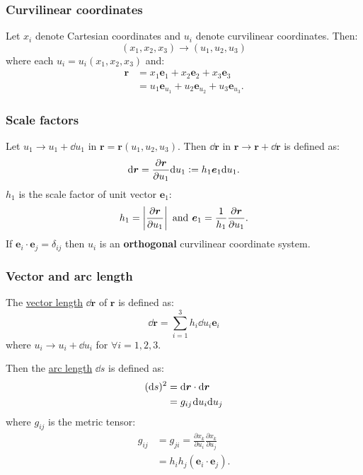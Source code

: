 \documentclass{article}
\newcommand{\deq}{\vcentcolon=}
\newcommand{\vc}[1]{\boldsymbol{#1}}
\begin{document}
\begin{multicols*}{3}
\subsubsection*{Curvilinear coordinates}
Let $x_i$ denote Cartesian coordinates
and $u_i$ denote curvilinear coordinates. Then:
$$(x_1,x_2,x_3)\rightarrow(u_1,u_2,u_3)$$
where each $u_i=u_i(x_1,x_2,x_3)$ and:
\begin{align*}
    \vc{r}
    &=x_1\vc{e}_1+x_2\vc{e}_2+x_3\vc{e}_3 \\
    &=u_1\vc{e}_{u_1}+u_2\vc{e}_{u_2}+u_3\vc{e}_{u_3}.
\end{align*}

\subsubsection*{Scale factors}
Let $u_1\rightarrow u_1+\dd u_1$ in
$\boldsymbol{r}=\boldsymbol{r}(u_1,u_2,u_3)$.
Then $\dd\vc{r}$ in 
$\boldsymbol{r}\rightarrow\boldsymbol{r}+\dd\boldsymbol{r}$
is defined as:
$$\dd\boldsymbol{r}
=\frac{\partial\boldsymbol{r}}{\partial u_1}\dd u_1
\deq h_1\boldsymbol{e}_1\dd u_1.$$
$h_1$ is the scale factor of unit vector 
$\boldsymbol{e}_1$:
$$h_1=\left|\frac{\partial
\boldsymbol{r}}{\partial u_1}\right|
\hspace{0.05in}\text{and}\hspace{0.05in}
\boldsymbol{e}_1=\frac{1}{h_1}
\frac{\partial\boldsymbol{r}}{\partial u_1}.$$
If $\boldsymbol{e}_i\cdot\boldsymbol{e}_j=\delta_{ij}$
then $u_i$ is an \textbf{orthogonal}
curvilinear coordinate system.

\subsubsection*{Vector and arc length}
The \underline{vector length} 
$\dd\vc{r}$ of $\boldsymbol{r}$ 
is defined as:
$$\dd\boldsymbol{r}=
\sum_{i=1}^{3}h_i\dd u_i\boldsymbol{e}_i$$
where
$u_i\rightarrow u_i+\dd u_i$
for $\forall i=1,2,3$.

Then the \underline{arc length}
$\dd s$ is defined as:
\begin{align*}
    (\dd s)^2
    &=\dd\vc{r}\cdot\dd\vc{r} \\
    &=g_{ij}\hspace{0.01in}\dd u_i\dd u_j
\end{align*}
where $g_{ij}$ is the metric tensor:
\begin{align*}
    g_{ij}&=g_{ji}=\frac{\partial x_k}{\partial u_i}
    \frac{\partial x_k}{\partial u_j} \\
    &=h_i h_j(\vc{e}_i\cdot\vc{e}_j).
\end{align*}


\end{multicols*}
\end{document}
